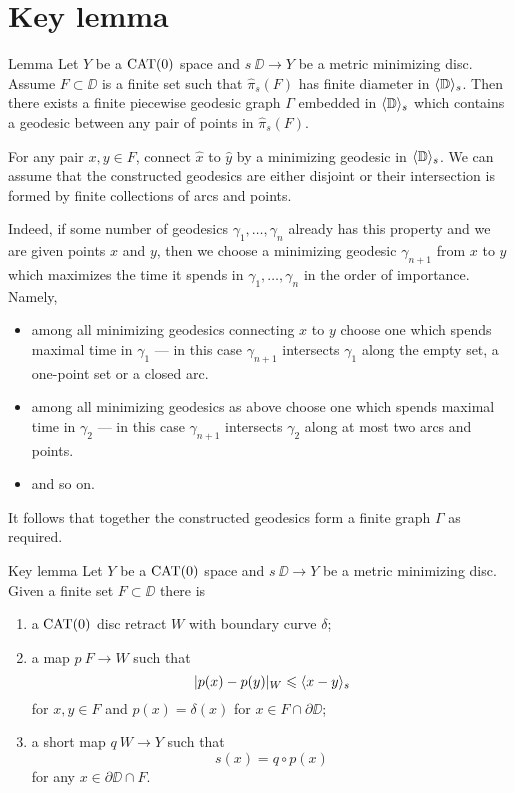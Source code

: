 \section{Key lemma}\label{Key Lemma}


\begin{thm}{Lemma}\label{lem:graph}
Let $Y$ be a $\mathop{\rm CAT}\nolimits(0)$ space and $s\:\DD\to Y$ 
be a metric minimizing disc.
Assume $F\subset \DD$ is a finite set such that $\hat\pi_s(F)$ has finite
diameter in $\langle\mathbb{D}\rangle_s$.
Then there exists a finite piecewise geodesic graph $\Gamma$ embedded in $\langle\mathbb{D}\rangle_s$ which contains a geodesic between any pair of points in $\hat\pi_s(F)$.
\end{thm} 

For any pair $x,y\in F$, connect $\hat x$ to $\hat y$ by a minimizing geodesic in $\langle\mathbb{D}\rangle_s$. 
We can assume that the constructed geodesics 
are either disjoint or their intersection is formed by finite collections of arcs and points.

Indeed, if some number of geodesics $\gamma_1,\dots,\gamma_n$ already has this property and we are given points $x$ and $y$, then
we choose a minimizing geodesic $\gamma_{n+1}$ from $x$ to $y$ which maximizes the time it spends in $\gamma_1,\dots,\gamma_n$  
in the order of importance.
Namely, 
\begin{itemize}
\item  among all minimizing geodesics connecting $x$ to $y$
choose one which spends maximal time in $\gamma_1$ --- in this case $\gamma_{n+1}$ intersects $\gamma_1$ along the empty set, 
a one-point set or a closed arc.
\item among all minimizing geodesics as above
choose one which spends maximal time in $\gamma_2$ --- in this case $\gamma_{n+1}$ intersects $\gamma_2$ along at most two arcs and points.
\item and so on.
\end{itemize}

It follows that together the constructed geodesics form a finite graph $\Gamma$ as required.
\qeds



\begin{thm}{Key lemma}\label{lem:key}
Let $Y$ be a $\mathop{\rm CAT}\nolimits(0)$ space and $s\:\DD\to Y$ 
be a metric minimizing disc.
Given a finite set $F\subset \DD$
there is 
\begin{enumerate}[(1)]
	\item a $\mathop{\rm CAT}\nolimits(0)$ disc retract $W$ with boundary curve $\delta$;
	\item a map $p\:F\to W$ such that
\[|p(x)-p(y)|_W\leqslant \langle x-y\rangle_s\] 
for $x,y\in F$ and $p(x)=\delta(x)$ for $x\in F\cap \partial\DD$;
  \item a short map $q\:W\to Y$ such that
\[s(x)=q\circ p(x)\] 
for any $x\in\partial\DD\cap F$.
\end{enumerate}
 
\end{thm} 

